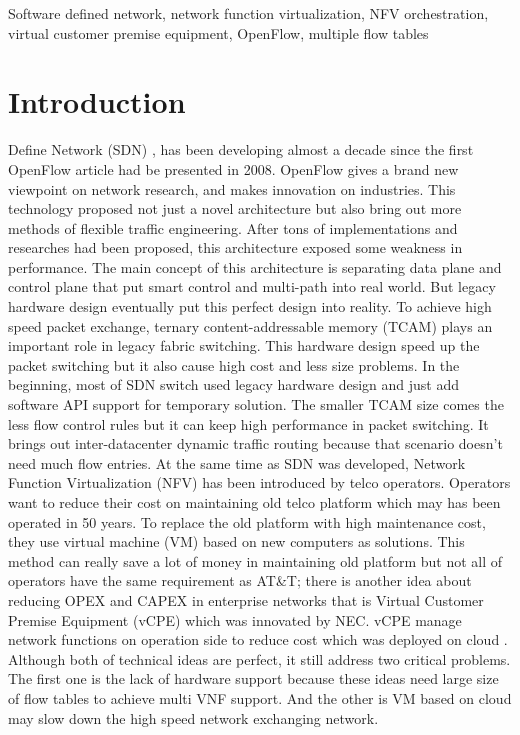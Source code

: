 \documentclass[journal]{IEEEtran}
\begin{document}
\begin{IEEEkeywords}
Software defined network, network function virtualization, NFV orchestration, virtual customer premise equipment, OpenFlow, multiple flow tables
\end{IEEEkeywords}

\IEEEpeerreviewmaketitle{}


\section{Introduction}
 Define Network (SDN) \cite{sdn-new-norm}, \cite{sdn-comprehensive} has been developing almost a decade since the first OpenFlow article had be presented in 2008\cite{openflow-campus-network}. OpenFlow\cite{sp:openflow13} gives a brand new viewpoint on network research, and makes innovation on industries. This technology proposed not just a novel architecture but also bring out more methods of flexible traffic engineering. After tons of implementations and researches had been proposed, this architecture exposed some weakness in performance. The main concept of this architecture is separating data plane and control plane that put smart control and multi-path into real world. But legacy hardware design eventually put this perfect design into reality. To achieve high speed packet exchange, ternary content-addressable memory (TCAM) plays an important role in legacy fabric switching. This hardware design speed up the packet switching but it also cause high cost and less size problems.
In the beginning, most of SDN switch used legacy hardware design and just add software API support for temporary solution. The smaller TCAM size comes the less flow control rules but it can keep high performance in packet switching. It brings out inter-datacenter dynamic traffic routing because that scenario doesn’t need much flow entries.
At the same time as SDN was developed, Network Function Virtualization (NFV) \cite{nfvwp,nfv-survey,laptop-sdn} has been introduced by telco operators. Operators want to reduce their cost on maintaining old telco platform which may has been operated in 50 years. To replace the old platform with high maintenance cost, they use virtual machine (VM) based on new computers as solutions. This method can really save a lot of money in maintaining old platform but not all of operators have the same requirement as AT\&T; there is another idea about reducing OPEX and CAPEX in enterprise networks that is Virtual Customer Premise Equipment (vCPE) which was innovated by NEC\cite{nec-vcpe}. vCPE manage network functions on operation side to reduce cost which was deployed on cloud \cite{cloud4nfv}. Although both of technical ideas are perfect, it still address two critical problems. The first one is the lack of hardware support because these ideas need large size of flow tables to achieve multi VNF support. And the other is VM based on cloud may slow down the high speed network exchanging network\cite{nfv-placemet, nfv-placement-model}.
\end{document}
